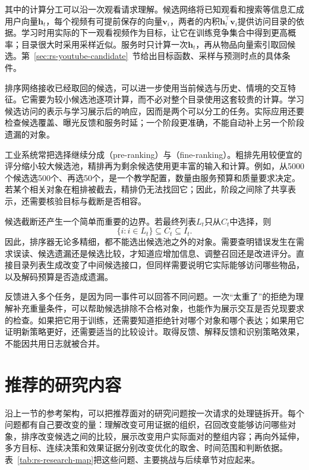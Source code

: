 其中的计算分工可以沿一次观看请求理解。候选网络将已知观看和搜索等信息汇成用户向量$\bm h_t$，每个视频有可提前保存的向量$\bm v_i$，两者的内积$\bm h_t^\top\bm v_i$提供访问目录的依据。学习时用实际的下一观看视频作为目标，让它在训练竞争集合中得到更高概率；目录很大时采用采样近似。服务时只计算一次$\bm h_t$，再从物品向量索引取回候选。第~\ref{sec:rs-youtube-candidate}~节给出目标函数、采样与预测时点的具体条件。

排序网络接收已经取回的候选，可以进一步使用当前候选与历史、情境的交互特征。它需要为较小候选池逐项计算，而不必对整个目录使用这套较贵的计算。学习候选访问的表示与学习展示后的响应，因而是两个可以分工的任务。实际应用还要检查候选覆盖、曝光反馈和服务时延；一个阶段更准确，不能自动补上另一个阶段遗漏的对象。

工业系统常把选择继续分成（pre-ranking）与（fine-ranking）。粗排先用较便宜的评分缩小较大候选池，精排再为剩余候选使用更丰富的输入和计算。例如，从5000个候选选500个、再选50个，是一个教学配置，数量由服务预算和质量要求决定。若某个相关对象在粗排被截去，精排仍无法找回它；因此，阶段之间除了共享表示，还需要核验目标与截断是否相容。

候选截断还产生一个简单而重要的边界。若最终列表$L_t$只从$C_t$中选择，则
\begin{equation}
  \{i:i\in L_t\}\subseteq C_t\subseteq I_t.
  \label{eq:rs-candidate-containment}
\end{equation}
因此，排序器无论多精细，都不能选出候选池之外的对象。需要查明错误发生在需求误读、候选遗漏还是候选比较，才知道应增加信息、调整召回还是改进评分。直接目录列表生成改变了中间候选接口，但同样需要说明它实际能够访问哪些物品，以及解码预算是否造成遗漏。

反馈进入多个任务，是因为同一事件可以回答不同问题。一次“太重了”的拒绝为理解补充重量条件，可以帮助候选排除不合格对象，也能作为展示交互是否兑现要求的检查。如果把它用于训练，还需要知道拒绝针对哪个对象和哪个表达；如果用它证明新策略更好，还需要适当的比较设计。取得反馈、解释反馈和识别策略效果，不能因共用日志就被合并。

\section{推荐的研究内容}
\label{sec:rs-research-problems}

沿上一节的参考架构，可以把推荐面对的研究问题按一次请求的处理链拆开。每个问题都有自己要改变的量：理解改变可用证据的组织，召回改变能够访问哪些对象，排序改变候选之间的比较，展示改变用户实际面对的整组内容；再向外延伸，多方目标、连续决策和效果证据分别改变优化的取舍、时间范围和判断依据。表~\ref{tab:rs-research-map}把这些问题、主要挑战与后续章节对应起来。

